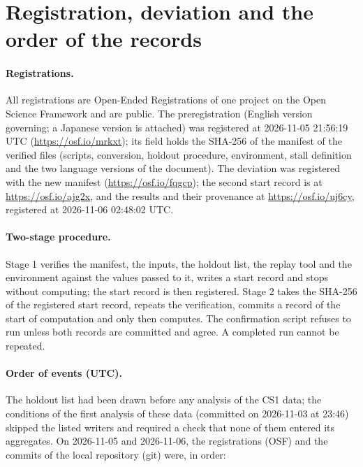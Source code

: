 \renewcommand{\thesection}{S\arabic{section}}
\setcounter{section}{0}

\section{Registration, deviation and the order of the records}
\label{app:prereg}

\paragraph{Registrations.} All registrations are Open-Ended Registrations of one project on the Open Science Framework
and are public. The preregistration (English version governing; a Japanese version is attached) was registered at
2026-11-05 21:56:19 UTC (\url{https://osf.io/mrkxt}); its field holds the SHA-256 of the manifest of the verified files
(scripts, conversion, holdout procedure, environment, stall definition and the two language versions of the document).
The deviation was registered with the new manifest (\url{https://osf.io/fqgcp}); the second start record is at
\url{https://osf.io/ajg2x}, and the results and their provenance at \url{https://osf.io/uj6cy}, registered at
2026-11-06 02:48:02 UTC.

\paragraph{Two-stage procedure.} Stage 1 verifies the manifest, the inputs, the holdout list, the replay tool and the
environment against the values passed to it, writes a start record and stops without computing; the start record is
then registered. Stage 2 takes the SHA-256 of the registered start record, repeats the verification, commits a record
of the start of computation and only then computes. The confirmation script refuses to run unless both records are
committed and agree. A completed run cannot be repeated.

\paragraph{Order of events (UTC).} The holdout list had been drawn before any analysis of the CS1 data; the conditions
of the first analysis of these data (committed on 2026-11-03 at 23:46) skipped the listed writers and required a check
that none of them entered its aggregates. On 2026-11-05 and 2026-11-06, the registrations (OSF) and the commits of the
local repository (git) were, in order:

